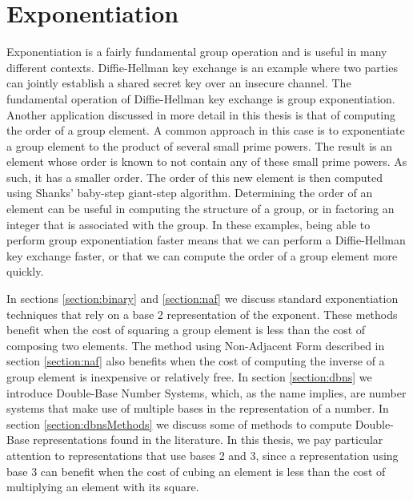 \documentclass{ucalgthes1}
\theoremstyle{plain}
\theoremstyle{definition}
\begin{document}
\setcounter{chapter}{2}
\chapter{Exponentiation}

Exponentiation is a fairly fundamental group operation and is useful in many different contexts.  Diffie-Hellman key exchange is an example where two parties can jointly establish a shared secret key over an insecure channel.  
 The fundamental operation of Diffie-Hellman key exchange is group exponentiation. Another application discussed in more detail in this thesis is that of computing the order of a group element.  A common approach in this case is to exponentiate a group element to the product of several small prime powers.  The result is an element whose order is known to not contain any of these small prime powers.  As such, it has a smaller order.  The order of this new element is then computed using Shanks' baby-step giant-step algorithm.  Determining the order of an element can be useful in computing the structure of a group, or in factoring an integer that is associated with the group.  In these examples, being able to perform group exponentiation faster means that we can perform a Diffie-Hellman key exchange faster, or that we can compute the order of a group element more quickly.

In sections \ref{section:binary} and \ref{section:naf} we discuss standard exponentiation techniques that rely on a base 2 representation of the exponent.  These methods benefit when the cost of squaring a group element is less than the cost of composing two elements. The method using Non-Adjacent Form described in section \ref{section:naf} also benefits when the cost of computing the inverse of a group element is inexpensive or relatively free.  In section \ref{section:dbns} we introduce Double-Base Number Systems, which, as the name implies, are number systems that make use of multiple bases in the representation of a number.  In section \ref{section:dbnsMethods} we discuss some of methods to compute Double-Base representations found in the literature.  In this thesis, we pay particular attention to representations that use bases 2 and 3, since a representation using base 3 can benefit when the cost of cubing an element is less than the cost of multiplying an element with its square.


\bigbreak
\end{document}

